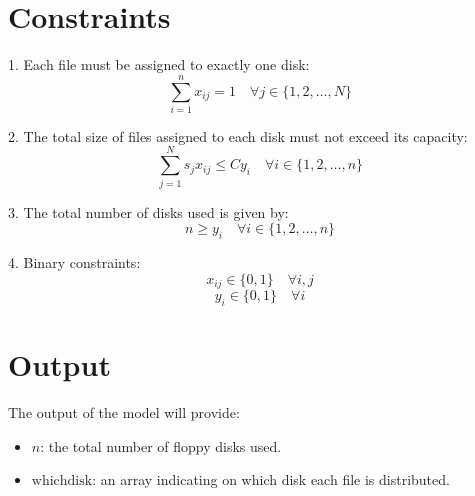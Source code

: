 \documentclass{article}
\begin{document}
\section*{Constraints}
1. Each file must be assigned to exactly one disk:
   \[
   \sum_{i=1}^{n} x_{ij} = 1 \quad \forall j \in \{1, 2, \ldots, N\}
   \]

2. The total size of files assigned to each disk must not exceed its capacity:
   \[
   \sum_{j=1}^{N} s_j x_{ij} \leq C y_i \quad \forall i \in \{1, 2, \ldots, n\}
   \]

3. The total number of disks used is given by:
   \[
   n \geq y_i \quad \forall i \in \{1, 2, \ldots, n\}
   \]

4. Binary constraints:
   \[
   x_{ij} \in \{0, 1\} \quad \forall i, j
   \]
   \[
   y_i \in \{0, 1\} \quad \forall i
   \]

\section*{Output}
The output of the model will provide:
\begin{itemize}
    \item \( n \): the total number of floppy disks used.
    \item \( \text{whichdisk} \): an array indicating on which disk each file is distributed.
\end{itemize}
\end{document}
